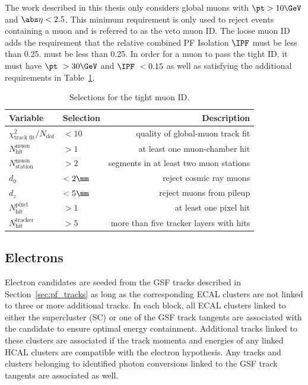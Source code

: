 The work described in this thesis only considers global muons with $\pt > 10\GeV$ and $\abs\eta < 2.5$.
This minimum requirement is only used to reject events containing a muon and is referred to as the veto muon ID. 
The loose muon ID adds the requirement that the relative combined PF Isolation $\IPF$ must be less than 0.25.
 must be less than 0.25.
In order for a muon to pass the tight ID, it must have $\pt\ > 30\GeV$ and $\IPF\ < 0.15$ as well as satisfying the additional requirements in Table~\ref{tab:muid}.

\begin{table}[htbp]
  \begin{center}
    \begin{tabular}{l | l | r}
      Variable & Selection & Description \\
      \hline
      $\chi^2_{\text{track fit}}/ N_{\text{dof}}$ & $ < 10$ & quality of global-muon track fit \\ 
      $N_{\text{hit}}^{\text{muon}}$ & $ > 1$ & at least one muon-chamber hit\\
      $N_{\text{station}}^{\text{muon}}$ & $ > 2$ & segments in at least two muon stations \\
      $d_0$ & $ < 2\mm$ & reject cosmic ray muons \\
      $d_z$ & $ < 5\mm$ & reject muons from pileup \\
      $N_{\text{hit}}^{\text{pixel}}$ & $ > 1$ & at least one pixel hit \\
      $N_{\text{hit}}^{\text{tracker}}$ & $ > 5$ & more than five tracker layers with hits 
    \end{tabular}
    \caption{Selections for the tight muon ID.}
    \label{tab:muid}
  \end{center}
\end{table}

\subsection{Electrons}
\label{sec:pf_electrons}

Electron candidates are seeded from the GSF tracks described in Section~\ref{sec:pf_tracks} as long as the corresponding ECAL clusters are not linked to three or more additional tracks.
In each block, all ECAL clusters linked to either the supercluster (SC) or one of the GSF track tangents are associated with the candidate to ensure optimal energy containment.
Additional tracks linked to these clusters are associated if the track momenta and energies of any linked HCAL clusters are compatible with the electron hypothesis.
Any tracks and clusters belonging to identified photon conversions linked to the GSF track tangents are associated as well.  


